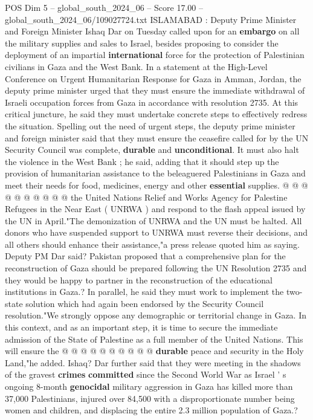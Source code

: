 \begin{textsample}{POS Dim 5 – global\_south\_2024\_06 – Score 17.00 – global\_south\_2024\_06/109027724.txt}  \label{ex:f5_pos_223}
ISLAMABAD : Deputy Prime Minister and Foreign Minister Ishaq Dar on Tuesday called upon for an \textbf{embargo} on all the military supplies and sales to Israel, besides proposing to consider the deployment of an impartial \textbf{international} force for the protection of Palestinian civilians in Gaza and the West Bank.
In a statement at the High-Level Conference on Urgent Humanitarian Response for Gaza in Amman, Jordan, the deputy prime minister urged that they must ensure the immediate withdrawal of Israeli occupation forces from Gaza in accordance with resolution 2735.
At this critical juncture, he said they must undertake concrete steps to effectively redress the situation.
Spelling out the need of urgent steps, the deputy prime minister and foreign minister said that they must ensure the ceasefire called for by the UN Security Council was complete, \textbf{durable} and \textbf{unconditional}.
It must also halt the violence in the West Bank ; he said, adding that it should step up the provision of humanitarian assistance to the beleaguered Palestinians in Gaza and meet their needs for food, medicines, energy and other \textbf{essential} supplies. @ @ @ @ @ @ @ @ @ @ the United Nations Relief and Works Agency for Palestine Refugees in the Near East ( UNRWA ) and respond to the flash appeal issued by the UN in April."The demonization of UNRWA and the UN must be halted.
All donors who have suspended support to UNRWA must reverse their decisions, and all others should enhance their assistance,"a press release quoted him as saying.
Deputy PM Dar said?
Pakistan proposed that a comprehensive plan for the reconstruction of Gaza should be prepared following the UN Resolution 2735 and they would be happy to partner in the reconstruction of the educational institutions in Gaza.?
In parallel, he said they must work to implement the two-state solution which had again been endorsed by the Security Council resolution."We strongly oppose any demographic or territorial change in Gaza.
In this context, and as an important step, it is time to secure the immediate admission of the State of Palestine as a full member of the United Nations.
This will ensure the @ @ @ @ @ @ @ @ @ @ \textbf{durable} peace and security in the Holy Land,"he added.
Ishaq?
Dar further said that they were meeting in the shadows of the gravest \textbf{crimes} \textbf{committed} since the Second World War as Israel ' s ongoing 8-month \textbf{genocidal} military aggression in Gaza has killed more than 37,000 Palestinians, injured over 84,500 with a disproportionate number being women and children, and displacing the entire 2.3 million population of Gaza.?

\end{textsample}
